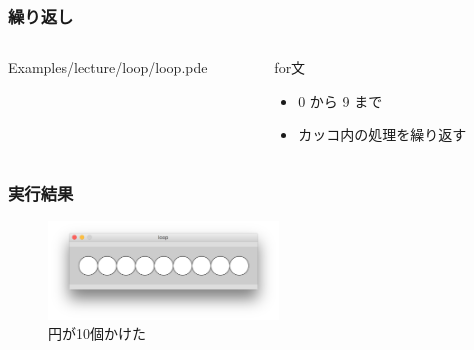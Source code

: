 \documentclass[10pt, dvipdfmx]{beamer}
\begin{document}
        \begin{frame}
            \frametitle{繰り返し}
            \begin{columns}[c]
                \begin{column}{0.50\textwidth}
                    \tiny
                    Examples/lecture/loop/loop.pde
                    \scriptsize
                \end{column}
                \begin{column}{0.50\textwidth}
                    \begin{block}{for文}
                        \begin{itemize}
                            \item 0 から 9 まで
                            \item カッコ内の処理を繰り返す
                        \end{itemize}
                    \end{block}
                \end{column}
            \end{columns}
        \end{frame}

        \begin{frame}
            \frametitle{実行結果}
                \begin{figure}[htb]
                    \includegraphics[width=61mm]{images/12.png}
                    \caption{円が10個かけた}
                    \label{fig:12}
                \end{figure}
        \end{frame}
\end{document}
